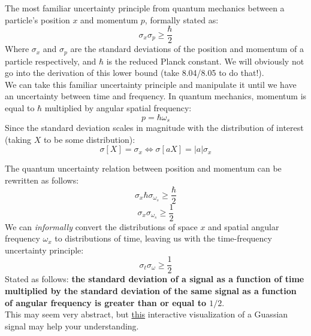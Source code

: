 \documentclass[a4paper]{article}
\numberwithin{equation}{section}
\begin{document}
The most familiar uncertainty principle from quantum mechanics between a particle's position $x$ and momentum $p$, formally stated as:
\begin{equation}
\sigma_x \sigma_p \geq \frac{\hbar}{2}
\end{equation} 
Where $\sigma_x$ and $\sigma_p$ are the standard deviations of the position and momentum of a particle respectively, and $\hbar$ is the reduced Planck constant. We will obviously not go into the derivation of this lower bound (take 8.04/8.05 to do that!).\\

We can take this familiar uncertainty principle and manipulate it until we have an uncertainty between time and frequency. In quantum mechanics, momentum is equal to $\hbar$ multiplied by angular spatial frequency:
\begin{equation}
p=\hbar \omega_{s}
\end{equation}
Since the standard deviation scales in magnitude with the distribution of interest (taking $X$ to be some distribution):
\begin{equation}
\sigma[X]=\sigma_x \Longleftrightarrow \sigma[aX]=|a|\sigma_x
\end{equation}

The quantum uncertainty relation between position and momentum can be rewritten as follows:
\begin{equation}
\sigma_x \hbar  \sigma_{\omega_s} \geq \frac{\hbar}{2}
\end{equation} 
\begin{equation}
\sigma_x \sigma_{\omega_s} \geq \frac{1}{2}
\end{equation} 
We can \textit{informally} convert the distributions of space $x$ and spatial angular frequency $\omega_x$ to distributions of time, leaving us with the time-frequency uncertainty principle:
\begin{equation}
\boxed{
\sigma_t \sigma_{\omega} \geq \frac{1}{2}}
\end{equation} 
Stated as follows: \textbf{the standard deviation of a signal as a function of time multiplied by the standard deviation of the same signal as a function of angular frequency is greater than or equal to $1/2$}.\\

This may seem very abstract, but \href{https://www.desmos.com/calculator/ebjkfeufmd}{this} interactive visualization of a Guassian signal may help your understanding.
\end{document}

